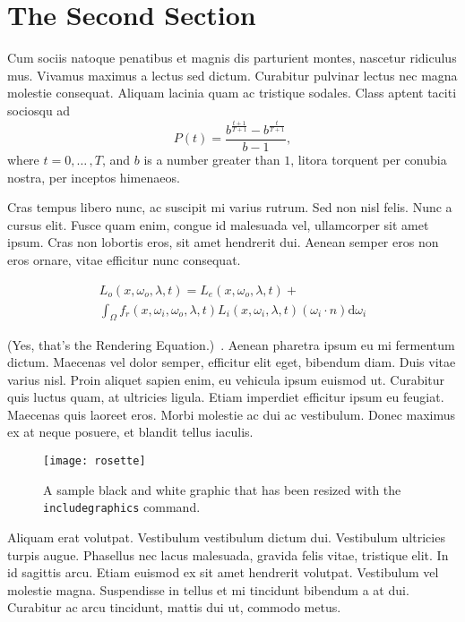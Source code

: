 \documentclass[sigconf]{acmart}
\begin{document}
\section{The Second Section}

Cum sociis natoque penatibus et magnis dis parturient montes, nascetur ridiculus mus. Vivamus maximus a lectus sed dictum. Curabitur pulvinar lectus nec magna molestie consequat. Aliquam lacinia quam ac tristique sodales. Class aptent taciti sociosqu ad 
\begin{equation}
\label{eqn:01}
P(t)=\frac{b^{\frac{t+1}{T+1}}-b^{\frac{t}{T+1}}}{b-1},
\end{equation}
where $t=0,{\ldots}\,,T$, and $b$ is a number greater than $1$, litora torquent per conubia nostra, per inceptos himenaeos.

Cras tempus libero nunc, ac suscipit mi varius rutrum. Sed non nisl felis. Nunc a cursus elit. Fusce quam enim, congue id malesuada vel, ullamcorper sit amet ipsum. Cras non lobortis eros, sit amet hendrerit dui. Aenean semper eros non eros ornare, vitae efficitur nunc consequat. 

\begin{multline}
\label{the-rendering-equation}
L_o(x, \omega_o, \lambda, t) = L_e(x, \omega_o, \lambda, t)  + \\
\int_{\Omega} f_r(x, \omega_i, \omega_o, \lambda, t) L_i(x, \omega_i, \lambda, t)(\omega_i \cdot n) \text{d} \omega_i
\end{multline}

(Yes, that's the Rendering Equation.)~\cite{Kajiya:1986:RE:15922.15902}. Aenean pharetra ipsum eu mi fermentum dictum. Maecenas vel dolor semper, efficitur elit eget, bibendum diam. Duis vitae varius nisl. Proin aliquet sapien enim, eu vehicula ipsum euismod ut. Curabitur quis luctus quam, at ultricies ligula. Etiam imperdiet efficitur ipsum eu feugiat. Maecenas quis laoreet eros. Morbi molestie ac dui ac vestibulum. Donec maximus ex at neque posuere, et blandit tellus iaculis.

\begin{figure}[h]
\texttt{[image: rosette]}
\caption{A sample black and white graphic that has
been resized with the \texttt{includegraphics} command.}
\end{figure}

Aliquam erat volutpat. Vestibulum vestibulum dictum dui. Vestibulum ultricies turpis augue. Phasellus nec lacus malesuada, gravida felis vitae, tristique elit. In id sagittis arcu. Etiam euismod ex sit amet hendrerit volutpat. Vestibulum vel molestie magna. Suspendisse in tellus et mi tincidunt bibendum a at dui. Curabitur ac arcu tincidunt, mattis dui ut, commodo metus.
\end{document}
